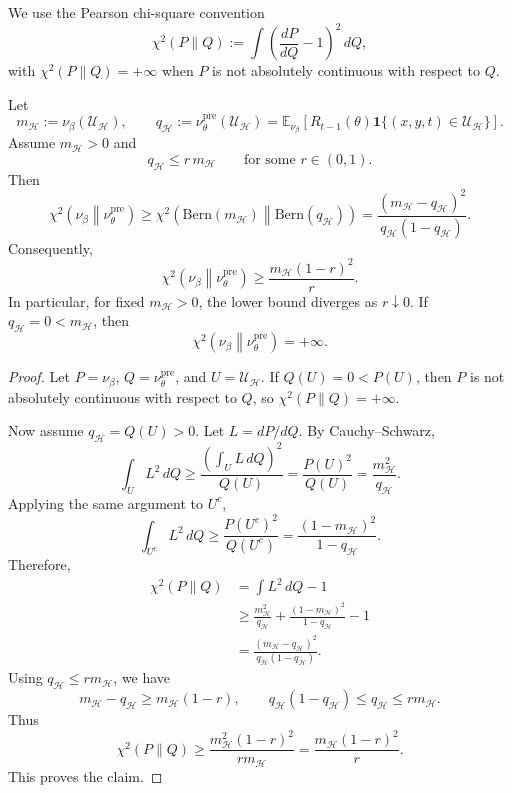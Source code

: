 We use the Pearson chi-square convention
\[
    \chi^2(P\|Q)
    :=
    \int \left(\frac{dP}{dQ}-1\right)^2\,dQ,
\]
with \(\chi^2(P\|Q)=+\infty\) when \(P\) is not absolutely continuous with
respect to \(Q\).

\begin{theorem}
\label{thm:retained-H-chi2}
Let
\[
    m_{\mathcal H}
    :=
    \nu_\beta(\mathcal U_{\mathcal H}),
    \qquad
    q_{\mathcal H}
    :=
    \nu_\theta^{\mathrm{pre}}(\mathcal U_{\mathcal H})
    =
    \mathbb E_{\nu_\beta}
    \left[
        R_{t-1}(\theta)\mathbf 1\{(x,y,t)\in\mathcal U_{\mathcal H}\}
    \right].
\]
Assume \(m_{\mathcal H}>0\) and
\[
    q_{\mathcal H} \le r\,m_{\mathcal H}
    \qquad\text{for some } r\in(0,1).
\]
Then
\[
    \chi^2\!\left(\nu_\beta\middle\|\nu_\theta^{\mathrm{pre}}\right)
    \ge
    \chi^2\!\left(
        \mathrm{Bern}(m_{\mathcal H})
        \middle\|
        \mathrm{Bern}(q_{\mathcal H})
    \right)
    =
    \frac{(m_{\mathcal H}-q_{\mathcal H})^2}{q_{\mathcal H}(1-q_{\mathcal H})}.
\]
Consequently,
\[
    \chi^2\!\left(\nu_\beta\middle\|\nu_\theta^{\mathrm{pre}}\right)
    \ge
    \frac{m_{\mathcal H}(1-r)^2}{r}.
\]
In particular, for fixed \(m_{\mathcal H}>0\), the lower bound diverges as
\(r\downarrow 0\). If \(q_{\mathcal H}=0<m_{\mathcal H}\), then
\[
    \chi^2\!\left(\nu_\beta\middle\|\nu_\theta^{\mathrm{pre}}\right)
    =
    +\infty .
\]
\end{theorem}

\begin{proof}
Let \(P=\nu_\beta\), \(Q=\nu_\theta^{\mathrm{pre}}\), and
\(U=\mathcal U_{\mathcal H}\). If \(Q(U)=0<P(U)\), then \(P\) is not absolutely continuous
with respect to \(Q\), so \(\chi^2(P\|Q)=+\infty\).

Now assume \(q_{\mathcal H}=Q(U)>0\). Let \(L=dP/dQ\). By Cauchy--Schwarz,
\[
    \int_U L^2\,dQ
    \ge
    \frac{\left(\int_U L\,dQ\right)^2}{Q(U)}
    =
    \frac{P(U)^2}{Q(U)}
    =
    \frac{m_{\mathcal H}^2}{q_{\mathcal H}}.
\]
Applying the same argument to \(U^c\),
\[
    \int_{U^c} L^2\,dQ
    \ge
    \frac{P(U^c)^2}{Q(U^c)}
    =
    \frac{(1-m_{\mathcal H})^2}{1-q_{\mathcal H}}.
\]
Therefore,
\[
\begin{aligned}
    \chi^2(P\|Q)
    &=
    \int L^2\,dQ -1 \\
    &\ge
    \frac{m_{\mathcal H}^2}{q_{\mathcal H}}
    +
    \frac{(1-m_{\mathcal H})^2}{1-q_{\mathcal H}}
    -1 \\
    &=
    \frac{(m_{\mathcal H}-q_{\mathcal H})^2}{q_{\mathcal H}(1-q_{\mathcal H})}.
\end{aligned}
\]
Using \(q_{\mathcal H}\le r m_{\mathcal H}\), we have
\[
    m_{\mathcal H}-q_{\mathcal H} \ge m_{\mathcal H}(1-r),
    \qquad
    q_{\mathcal H}(1-q_{\mathcal H})\le q_{\mathcal H} \le r m_{\mathcal H}.
\]
Thus
\[
    \chi^2(P\|Q)
    \ge
    \frac{m_{\mathcal H}^2(1-r)^2}{r m_{\mathcal H}}
    =
    \frac{m_{\mathcal H}(1-r)^2}{r}.
\]
This proves the claim.
\end{proof}

